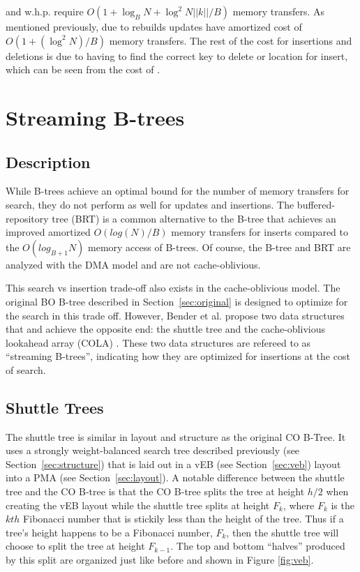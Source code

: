 \documentclass{style}
\begin{document}
\Insertkonly{} and \Delete{} w.h.p. require $O(1+\log_{B}N+\log^{2}N||k||/B)$ memory transfers. As mentioned previously, due to rebuilds updates have amortized cost of $O(1+(\log^{2}N)/B)$ memory transfers. The rest of the cost for insertions and deletions is due to having to find the correct key to delete or location for insert, which can be seen from the cost of \Search{}.

\section{Streaming B-trees}

\subsection{Description}

While B-trees achieve an optimal bound for the number of memory transfers for
search, they do not perform as well for updates and insertions. The
buffered-repository tree (BRT) is a common alternative to the B-tree that
achieves an improved amortized $O(log(N)/B)$ memory transfers for inserts
compared to the $O(log_{B+1}N)$ memory access of B-trees. Of course, the
B-tree and BRT are analyzed with the DMA model and are not cache-oblivious.

This search vs insertion trade-off also exists in the cache-oblivious model.
The original BO B-tree described in Section~\ref{sec:original} is designed to
optimize for the search in this trade off. However, Bender et al. propose two
data structures that and achieve the opposite end: the shuttle tree and the
cache-oblivious lookahead array (COLA) \cite{BenderFaFi07}. These two data
structures are refereed to as ``streaming B-trees'', indicating how they are
optimized for insertions at the cost of search.

\subsection{Shuttle Trees}

The shuttle tree is similar in layout and structure as the original CO B-Tree.
It uses a strongly weight-balanced search tree described previously (see
Section~\ref{sec:structure}) that is laid out in a vEB (see
Section~\ref{sec:veb}) layout into a PMA (see Section~\ref{sec:layout}). A
notable difference between the shuttle tree and the CO B-tree is that the CO
B-tree splits the tree at height $h/2$ when creating the vEB layout while the
shuttle tree splits at height $F_k$, where $F_k$ is the $kth$ Fibonacci number
that is stickily less than the height of the tree. Thus if a tree's height
happens to be a Fibonacci number, $F_k$, then the shuttle tree will choose to
split the tree at height $F_{k-1}$. The top and bottom ``halves'' produced by
this split are organized just like before and shown in Figure \ref{fig:veb}.
\end{document}
